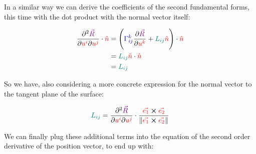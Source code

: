 In a similar way we can derive the coefficients of the second fundamental forms, this time with the dot product with the normal vector itself:

\begin{align*}
    \frac{\partial^2 \begingroup\color{violet}\vec{R}\endgroup}{\partial \begingroup\color{red}u^i\endgroup \partial\begingroup\color{red}u^j\endgroup} \cdot \begingroup\color{red}\hat{n}\endgroup &= 
    \left(\begingroup\color{blue}\Gamma^{k}_{ij}\endgroup \frac{\partial \begingroup\color{violet}\vec{R}\endgroup}{\partial \begingroup\color{red}u^k\endgroup} + \begingroup\color{teal}L_{ij}\endgroup \begingroup\color{red}\hat{n}\endgroup\right) \cdot \begingroup\color{red}\hat{n}\endgroup\\
    &= \begingroup\color{teal}L_{ij}\endgroup \begingroup\color{red}\hat{n}\endgroup \cdot \begingroup\color{red}\hat{n}\endgroup\\
    &= \begingroup\color{teal}L_{ij}\endgroup
\end{align*}

So we have, also considering a more concrete expression for the normal vector to the tangent plane of the surface:

\begin{equation}
    \begingroup\color{teal}L_{ij}\endgroup = \frac{\partial^2 \begingroup\color{violet}\vec{R}\endgroup}{\partial \begingroup\color{red}u^i\endgroup \partial\begingroup\color{red}u^j\endgroup} \cdot \frac{\begingroup\color{red}\vec{e_1}\endgroup \cross \begingroup\color{red}\vec{e_2}\endgroup}{\|\begingroup\color{red}\vec{e_1}\endgroup \cross \begingroup\color{red}\vec{e_2}\endgroup \|}
\end{equation}

We can finally plug these additional terms into the equation of the second order derivative of the position vector, to end up with:

